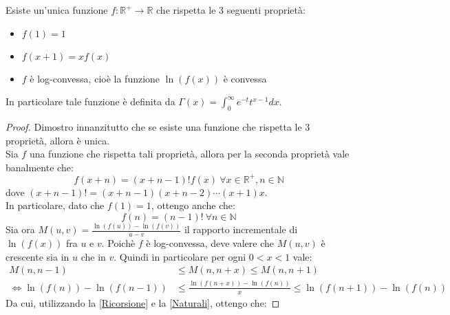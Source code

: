 \begin{theorem}
Esiste un'unica funzione $f :\mathbb{R}^{+}\rightarrow\mathbb{R} $ che rispetta le 3 seguenti proprietà:
\begin{itemize}
 \item $f(1)=1$
 \item $f(x+1)=xf(x)$
 \item $f$ è log-convessa, cioè la funzione $\ln(f(x))$ è convessa
\end{itemize}
In particolare tale funzione è definita da $\Gamma(x)=\int_0^{\infty}{e^{-t}t^{x-1}dx}$.
\end{theorem}

\begin{proof}
Dimostro innanzitutto che se esiste una funzione che rispetta le 3 proprietà, allora è unica.\\
Sia $f$ una funzione che rispetta tali proprietà, allora per la seconda proprietà vale banalmente che:
\begin{equation}
 \label{Ricorsione}
 f(x+n)=(x+n-1)!f(x)\ \forall x\in \mathbb{R}^+, n\in\mathbb{N}
\end{equation}
dove $(x+n-1)!=(x+n-1)(x+n-2)\cdots(x+1)x$.\\
In particolare, dato che $f(1)=1$, ottengo anche che:
\begin{equation}
 \label{Naturali}
 f(n)=(n-1)!\ \forall n\in \mathbb{N}
\end{equation}
Sia ora $M(u,v)=\frac{\ln(f(u))-\ln(f(v))}{u-v}$ il rapporto incrementale
di $\ln(f(x))$ fra $u$ e $v$. Poichè $f$ è log-convessa, deve valere che $M(u,v)$ è crescente sia in $u$ che in $v$.
Quindi in particolare per ogni $0<x<1$ vale:
\begin{equation*}
 \begin{split}
  M(n,n-1) & \le M(n,n+x) \le M(n,n+1) \\
  \iff \ln(f(n))-\ln(f(n-1)) & \le \frac{\ln(f(n+x))-\ln(f(n))}{x} \le \ln(f(n+1))-\ln(f(n)) 
  \end{split}
\end{equation*}
Da cui, utilizzando la \eqref{Ricorsione} e la \eqref{Naturali}, ottengo che:


\end{proof}
